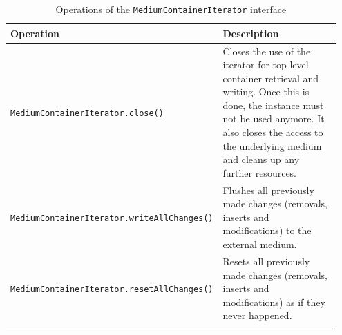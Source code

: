 \small
\begin{landscape}
\begin{longtable}{|p{0.3\linewidth}|p{0.65\linewidth}|}
\hline
\rowcolor[gray]{.9}\textbf{Operation} & \textbf{Description} \\
\endhead
\hline
\texttt{MediumContainerIterator}\linebreak\texttt{.close()} & Closes the use of the iterator for top-level container retrieval and writing. Once this is done, the instance must not be used anymore. It also closes the access to the underlying medium and cleans up any further resources. \\
\hline
\texttt{MediumContainerIterator}\linebreak\texttt{.writeAllChanges()} & Flushes all previously made changes (removals, inserts and modifications) to the external medium. \\
\hline
\texttt{MediumContainerIterator}\linebreak\texttt{.resetAllChanges()} & Resets all previously made changes (removals, inserts and modifications) as if they never happened. \\
\hline
\caption{Operations of the \texttt{MediumContainerIterator} interface}
\label{tab:DBOpsMediumContainerIterator}
\end{longtable}
\end{landscape}
\normalsize

